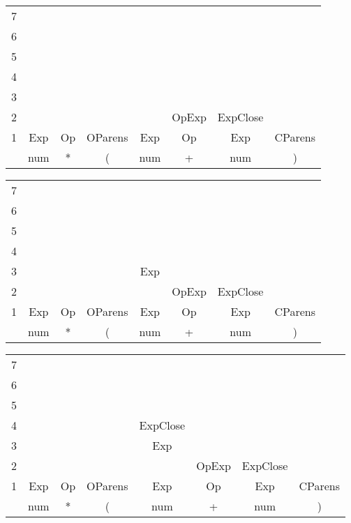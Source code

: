 \documentclass[fleqn]{article}
\begin{document}
\vspace{0.5in}



\begin{tabular}{r | c | c | c | c  | c | c | c|}
\cline{2-2}
7 &\\\cline{2-3}
6 && \\\cline{2-4}
5 && & \\\cline{2-5}
4 && & & \\\cline{2-6}
3 && & & & \\\cline{2-7}
2 & & & &  & \cellcolor{blue!25} OpExp & ExpClose \\\cline{2-8}
1 & Exp & Op & OParens & Exp & \cellcolor{blue!25}Op & \cellcolor{blue!25}Exp & CParens \\\cline{2-8}
& num & * & ( & num & + & num & ) \\\cline{2-8}
\cline {2-8}

\end{tabular}

\vspace{0.5in}

\begin{tabular}{r | c | c | c | c | c | c | c|}
\cline{2-2}
7 &\\\cline{2-3}
6 && \\\cline{2-4}
5 && & \\\cline{2-5}
4 && & & \\\cline{2-6}
3 && & & \cellcolor{blue!25}Exp & \\\cline{2-7}
2 & & & &  & \cellcolor{blue!25}OpExp & ExpClose \\\cline{2-8}
1 & Exp & Op & OParens & \cellcolor{blue!25}Exp & Op & Exp & CParens \\\cline{2-8}
& num & * & ( & num & + & num & ) \\\cline{2-8}
\cline {2-8}

\end{tabular}

\vspace{0.5in}

\begin{tabular}{r | c | c | c | c | c | c | c|}
\cline{2-2}
7 &\\\cline{2-3}
6 && \\\cline{2-4}
5 && & \\\cline{2-5}
4 && & & \cellcolor{blue!25}ExpClose \\\cline{2-6}
3 && & & Exp & \\\cline{2-7}
2 & & & &  & OpExp & ExpClose \\\cline{2-8}
1 & Exp & Op & OParens & Exp & Op & Exp & CParens \\\cline{2-8}
& num & * & ( & num & + & num & ) \\\cline{2-8}
\cline {2-8}

\end{tabular}
\end{document}
